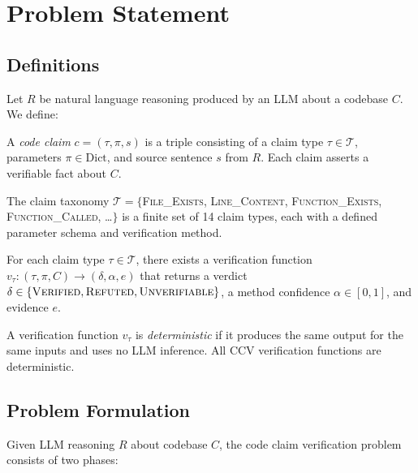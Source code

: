 \section{Problem Statement}
\label{sec:problem}

\subsection{Definitions}

Let $R$ be natural language reasoning produced by an LLM about a codebase $C$. We define:

\begin{definition}
A \emph{code claim} $c = (\tau, \pi, s)$ is a triple consisting of a claim type $\tau \in \mathcal{T}$, parameters $\pi \in \text{Dict}$, and source sentence $s$ from $R$. Each claim asserts a verifiable fact about $C$.
\end{definition}

\begin{definition}
The claim taxonomy $\mathcal{T} = \{$\textsc{File\_Exists}, \textsc{Line\_Content}, \textsc{Function\_Exists}, \textsc{Function\_Called}, \ldots$\}$ is a finite set of 14 claim types, each with a defined parameter schema and verification method.
\end{definition}

\begin{definition}
For each claim type $\tau \in \mathcal{T}$, there exists a verification function $v_\tau: (\tau, \pi, C) \rightarrow (\delta, \alpha, e)$ that returns a verdict $\delta \in \{\textsc{Verified}, \textsc{Refuted}, \textsc{Unverifiable}\}$, a method confidence $\alpha \in [0, 1]$, and evidence $e$.
\end{definition}

\begin{definition}
A verification function $v_\tau$ is \emph{deterministic} if it produces the same output for the same inputs and uses no LLM inference. All CCV verification functions are deterministic.
\end{definition}

\subsection{Problem Formulation}

Given LLM reasoning $R$ about codebase $C$, the code claim verification problem consists of two phases:

